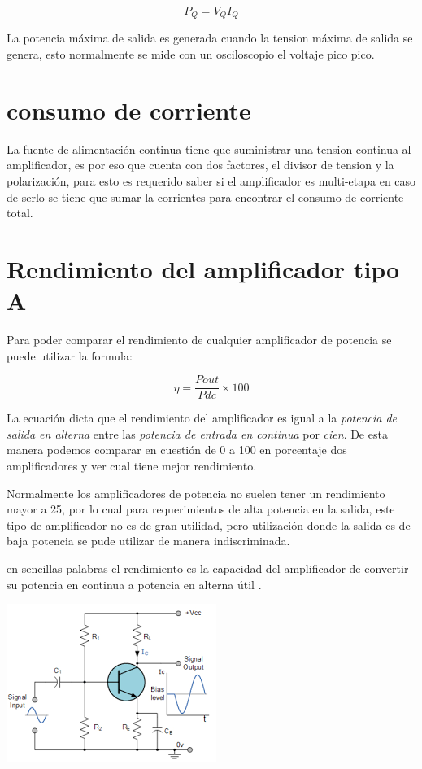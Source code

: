 \documentclass[11pt,a4paper]{article}
\begin{document}
\begin{equation}
P_Q={V_Q}{I_Q}
\end{equation}

La potencia máxima de salida es generada cuando la tension máxima de salida se genera, esto normalmente se mide con un osciloscopio el voltaje pico pico.

\section{consumo de corriente}

La fuente de alimentación continua tiene que suministrar una tension continua al amplificador, es por eso que cuenta con dos factores, el divisor de tension y la polarización, para esto es requerido saber si el amplificador es multi-etapa en caso de serlo se tiene que sumar la corrientes para encontrar el consumo de corriente total.

\section{Rendimiento del amplificador tipo A}

Para poder comparar el rendimiento de cualquier amplificador de potencia se puede utilizar la formula:

\begin{equation}
\eta=\frac{Pout}{Pdc}\times100
\end{equation}

La ecuación dicta que el rendimiento del amplificador es igual a la \emph{potencia de salida en alterna} entre las \emph{potencia de entrada en continua}  por \emph{cien}. De esta manera podemos comparar en cuestión de 0 a 100 en porcentaje dos amplificadores y ver cual tiene mejor rendimiento.

Normalmente los amplificadores de potencia no suelen tener un rendimiento mayor a 25, por lo cual para requerimientos de alta potencia en la salida, este tipo de amplificador no es de gran utilidad, pero utilización donde la salida es de baja potencia se pude utilizar de manera indiscriminada.

en sencillas palabras el rendimiento es la capacidad del amplificador de convertir su potencia en continua a potencia en alterna útil \cite{malvino}.

\begin{center}
\includegraphics[scale=1]{2.png}
\end{center}








  
\end{document}
